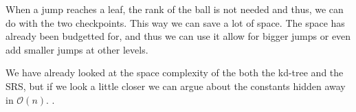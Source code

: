 When a jump reaches a leaf, the rank of the ball is not needed and thus, we can do with the two checkpoints. This way we can save a lot of space. The space has already been budgetted for, and thus we can use it allow for bigger jumps or even add smaller jumps at other levels.

We have already looked at the space complexity of the both the kd-tree and the SRS, but if we look a little closer we can argue about the constants hidden away in $\mathcal{O}(n)$. .




